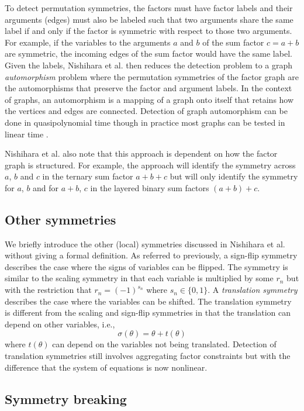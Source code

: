 To detect permutation symmetries, the factors must have factor labels and their arguments (edges) must also be labeled such that two arguments share the same label if and only if the factor is symmetric with respect to those two arguments. For example, if the variables to the arguments $a$ and $b$ of the sum factor $c=a+b$ are symmetric, the incoming edges of the sum factor would have the same label. Given the labels, Nishihara et al. then reduces the detection problem to a graph \textit{automorphism} problem where the permutation symmetries of the factor graph are the automorphisms that preserve the factor and argument labels. In the context of graphs, an automorphism is a mapping of a graph onto itself that retains how the vertices and edges are connected. Detection of graph automorphism can be done in quasipolynomial time \cite{Babai:2016} though in practice most graphs can be tested in linear time \cite{Babai:1980}.

Nishihara et al. also note that this approach is dependent on how the factor graph is structured. For example, the approach will identify the symmetry across $a$, $b$ and $c$ in the ternary sum factor $a+b+c$ but will only identify the symmetry for $a$, $b$ and for $a+b$, $c$ in the layered binary sum factors $(a+b)+c$.


\subsection{Other symmetries}

We briefly introduce the other (local) symmetries discussed in Nishihara et al. without giving a formal definition. As referred to previously, a sign-flip symmetry describes the case where the signs of variables can be flipped. The symmetry is similar to the scaling symmetry in that each variable is multiplied by some $r_n$ but with the restriction that $r_n=(-1)^{s_n}$ where $s_n\in\{0,1\}$.
A \textit{translation symmetry} describes the case where the variables can be shifted. The translation symmetry is different from the scaling and sign-flip symmetries in that the translation can depend on other variables, i.e.,
\[
\sigma(\theta)=\theta+t(\theta)
\]
where $t(\theta)$ can depend on the variables not being translated. Detection of translation symmetries still involves aggregating factor constraints but with the difference that the system of equations is now nonlinear.


\subsection{Symmetry breaking}

